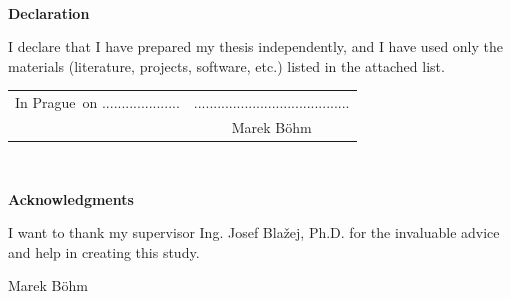 \documentclass[a4paper,twoside,12pt]{book}
\newcommand{\tb}{\textbf} %
\newcommand{\autor}{Marek Böhm}   %
\newcommand{\kde}{Prague} %
\newcommand{\prohlaseni}{I declare that I have prepared my thesis independently, and I have used only the materials (literature, projects, software, etc.) listed in the attached list.} %
\newcommand{\podekovani}{I want to thank my supervisor Ing. Josef Blažej, Ph.D. for the invaluable advice and help in creating this study.} %
\begin{document}
\newpage %
\thispagestyle{empty}  %

~ %
\vfill %

\tb{Declaration} %

\vspace{1em} %
\prohlaseni

\vspace{2em}  %
\hspace{-0.5em}\begin{tabularx}{\textwidth}{X c}  %
In \kde\ on .................... &........................................ \\	%
	& \autor
\end{tabularx}	%


\newpage
\thispagestyle{empty}

~
\vfill %


\tb{Acknowledgments}

\vspace{1em} %
\podekovani
\begin{flushright}
\autor
\end{flushright}  %


\newpage   %
\thispagestyle{empty}   %

\newbox\odstavecbox
\newlength\vyskaodstavce
\newcommand\odstavec[2]{%
    \setbox\odstavecbox=\hbox{%
         \parbox[t]{#1}{#2\vrule width 0pt depth 4pt}}%
    \global\vyskaodstavce=\dp\odstavecbox
    \box\odstavecbox}
\newcommand{\delka}{110mm} %
\end{document}
